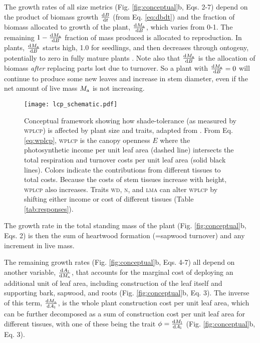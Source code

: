 \documentclass[9pt,twocolumn,twoside,lineno]{pnas-new}
\newcommand{\lma}{\textsc{lma}}
\newcommand{\wood}{\textsc{wd}}
\newcommand{\nitrogen}{\textsc{n}}
\begin{document}
The growth rates of all size metrics (Fig. \ref{fig:conceptual}b, Eqs. {\color{pnasbluetext}2}-{\color{pnasbluetext}7}) depend on the product of biomass growth $\frac{{\rm d}B}{{\rm d}t}$ (from Eq. \ref{eq:dbdt}) and the fraction of biomass allocated to growth of the plant, $\frac{{\rm d}M_{\rm a}}{{\rm d}B}$, which varies from 0-1. The remaining $1- \frac{{\rm d}M_{\rm a}}{{\rm d}B}$ fraction of mass produced is allocated to reproduction. In plants, $\frac{{\rm d}M_{\rm a}}{{\rm d}B}$ starts high, 1.0 for seedlings, and then decreases through ontogeny, potentially to zero in fully mature plants \citep{Wenk-2015}. Note also that $\frac{{\rm d}M_{\rm a}}{{\rm d}B}$ is the allocation of biomass \emph{after} replacing parts lost due to turnover. So a plant with $\frac{{\rm d}M_{\rm a}}{{\rm d}B}=0$ will continue to produce some new leaves and increase in stem diameter, even if the net amount of live mass $M_{\rm a}$ is not increasing.


\begin{figure}[!ht]
\centering
\texttt{[image: lcp\_schematic.pdf]}

\caption{Conceptual framework showing how shade-tolerance (as measured by \textsc{wplcp}) is affected by plant size and traits, adapted from \citep{Givnish-1988}. From Eq. \ref{eq:wplcp}, \textsc{wplcp} is the canopy openness $E$ where the photosynthetic income per unit leaf area (dashed line) intersects the total respiration and turnover costs per unit leaf area (solid black lines). Colors indicate the contributions from different tissues to total costs. Because the costs of stem tissues increase with height, \textsc{wplcp} also increases. Traits {\wood}, {\nitrogen}, and {\lma} can alter \textsc{wplcp} by shifting either income or cost of different tissues (Table \ref{tab:responses}).
\label{fig:wplcp_idea}}
\end{figure}


The growth rate in the total standing mass of the plant (Fig. \ref{fig:conceptual}b, Eqs. {\color{pnasbluetext}2}) is then the sum of heartwood formation (=sapwood turnover) and any increment in live mass.

The remaining growth rates (Fig. \ref{fig:conceptual}b, Eqs. {\color{pnasbluetext}4}-{\color{pnasbluetext}7}) all depend on another variable, $\frac{{\rm d}A_{\rm l}} {{\rm d}M_{\rm a}}$, that accounts for the marginal cost of deploying an additional unit of leaf area, including construction of the leaf itself and supporting  bark, sapwood, and roots (Fig. \ref{fig:conceptual}b, Eq. {\color{pnasbluetext}3}). The inverse of this term, $\frac{{\rm d}M_{\rm a} }{{\rm d}A_{\rm l}}$, is the whole plant construction cost per unit leaf area, which can be further decomposed as a sum of construction cost per unit leaf area for different tissues, with one of these being the trait $\phi = \frac{{\rm d}M_{\rm l} }{{\rm d}A_{\rm l}}$ (Fig. \ref{fig:conceptual}b, Eq. {\color{pnasbluetext}3}).
\end{document}
